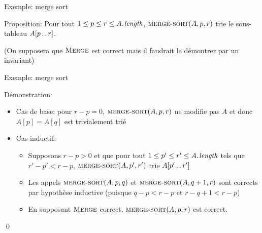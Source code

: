 \begin{frame}{Exemple: merge sort}
\begin{center}\small
{}
\end{center}

Proposition: Pour tout $1\leq p\leq r\leq \attrib{A}{length}$, $\textnormal{\scshape merge-sort}(A,p,r)$ trie le sous-tableau $A[p\mathinner{\ldotp\ldotp} r]$.

\bigskip

(On supposera que $\textnormal{\scshape Merge}$ est correct mais il faudrait le démontrer par un invariant)

\end{frame}

\begin{frame}{Exemple: merge sort}
\begin{center}\small
{}
\end{center}

Démonstration:
\begin{itemize}
\item Cas de base: pour $r-p=0$, $\textnormal{\scshape merge-sort}(A,p,r)$ ne modifie pas $A$ et donc $A[p]=A[q]$ est trivialement trié
\item Cas inductif:
\begin{itemize}
\item Supposons $r-p>0$ et que pour tout $1\leq p'\leq r'\leq \attrib{A}{length}$ tels que $r'-p'<r-p$, $\textnormal{\scshape merge-sort}(A,p',r')$ trie $A[p'\mathinner{\ldotp\ldotp} r']$
\item Les appels $\textnormal{\scshape merge-sort}(A,p,q)$ et $\textnormal{\scshape merge-sort}(A,q+1,r)$ sont corrects par hypothèse inductive (puisque $q-p<r-p$ et $r-q+1<r-p$)
\item En supposant $\textnormal{\scshape Merge}$ correct, $\textnormal{\scshape merge-sort}(A,p,r)$ est correct.
\end{itemize}
\end{itemize}\qed
{}
\end{frame}

